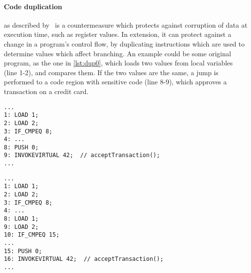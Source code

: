 \paragraph{Code duplication}as described by~\cite[p. 12]{javasec} is a countermeasure which protects against corruption of data at execution time, such as register values. In extension, it can protect against a change in a program's control flow, by duplicating instructions which are used to determine values which affect branching. An example could be some original program, as the one in \cref{lst:dup0}, which loads two values from local variables (line 1-2), and compares them. If the two values are the same, a jump is performed to a code region with sensitive code (line 8-9), which approves a transaction on a credit card.

\begin{lstlisting}[caption={Original program without code duplication implemented. The code is written in \jcl. Note that for simplicity, the numbers in the left side are line numbers and do not denote the program counter values.}, label={lst:dup0}]
...
1: LOAD 1;
2: LOAD 2;
3: IF_CMPEQ 8;
4: ...
8: PUSH 0;
9: INVOKEVIRTUAL 42;  // acceptTransaction();
...
\end{lstlisting}

\begin{lstlisting}[caption={Modified program with code duplication implemented. The code is written in \jcl. Note that for simplicity, the numbers in the left side are line numbers and do not denote the program counter values.}, label={lst:dup0}]
...
1: LOAD 1;
2: LOAD 2;
3: IF_CMPEQ 8;
4: ...
8: LOAD 1;
9: LOAD 2;
10: IF_CMPEQ 15;
...
15: PUSH 0;
16: INVOKEVIRTUAL 42;  // acceptTransaction();
...
\end{lstlisting}